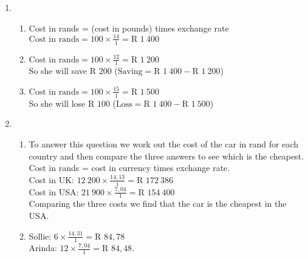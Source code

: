  \begin{solutions}{}{
\begin{enumerate}[itemsep=5pt, label=\textbf{\arabic*}. ] 


\item \begin{enumerate}[noitemsep, label=\textbf{(\alph*)} ]
\item Cost in rands = (cost in pounds) times exchange rate\\
$\text{Cost in rands}=100 \times \frac{14}{1} = \text{R }1~400$
\item $\text{Cost in rands}=100 \times \frac{12}{1} = \text{R }1~200$\\
So she will save $\text{R }200$ ($\text{Saving} = \text{R }1~400 - \text{R }1~200$)
\item $\text{Cost in rands}=100 \times \frac{15}{1} = \text{R }1~500$ \\
So she will lose $\text{R }100$ ($\text{Loss} = \text{R }1~400 - \text{R }1~500$)
\end{enumerate}
\item \begin{enumerate}[noitemsep, label=\textbf{(\alph*)} ]
\item To answer this question we work out the cost of the car in rand for each country and then compare the three answers to see which is the cheapest. Cost in rands = cost in currency times exchange rate.\\
Cost in UK: $12~200 \times \frac{14,13}{1} = \text{R }172~386$\\
Cost in USA: $21~900 \times \frac{7,04}{1} = \text{R }154~400$\\
Comparing the three costs we find that the car is the cheapest in the USA.
\item Sollie: $6 \times \frac{14,31}{1} = \text{R }84,78$\\
Arinda: $12 \times \frac{7,04}{1} = \text{R }84,48$.
\end{enumerate}

\end{enumerate}}
\end{solutions}


